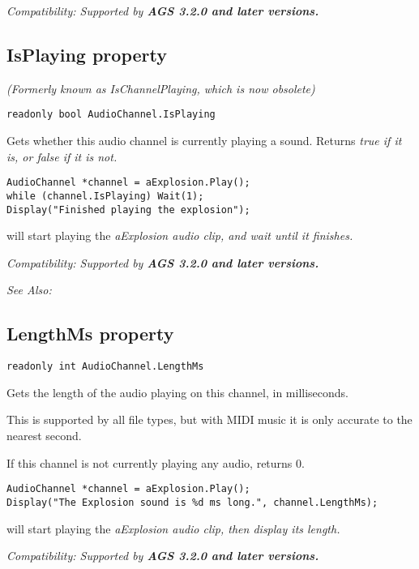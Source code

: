 \it{Compatibility:} Supported by \bf{AGS 3.2.0} and later versions.


\subsection{IsPlaying property}\label{AudioChannel.IsPlaying}%

\it{(Formerly known as IsChannelPlaying, which is now obsolete)}

\begin{verbatim}
readonly bool AudioChannel.IsPlaying
\end{verbatim}
Gets whether this audio channel is currently playing a sound. Returns \it{true} if it is,
or \it{false} if it is not.

\begin{verbatim}
AudioChannel *channel = aExplosion.Play();
while (channel.IsPlaying) Wait(1);
Display("Finished playing the explosion");
\end{verbatim}
will start playing the \it{aExplosion} audio clip, and wait until it finishes.

\it{Compatibility:} Supported by \bf{AGS 3.2.0} and later versions.

\it{See Also:} 


\subsection{LengthMs property}\label{AudioChannel.LengthMs}%

\begin{verbatim}
readonly int AudioChannel.LengthMs
\end{verbatim}
Gets the length of the audio playing on this channel, in milliseconds.

This is supported by all file types, but with MIDI music it is only accurate to the nearest second.

If this channel is not currently playing any audio, returns 0.

\begin{verbatim}
AudioChannel *channel = aExplosion.Play();
Display("The Explosion sound is %d ms long.", channel.LengthMs);
\end{verbatim}
will start playing the \it{aExplosion} audio clip, then display its length.

\it{Compatibility:} Supported by \bf{AGS 3.2.0} and later versions.

